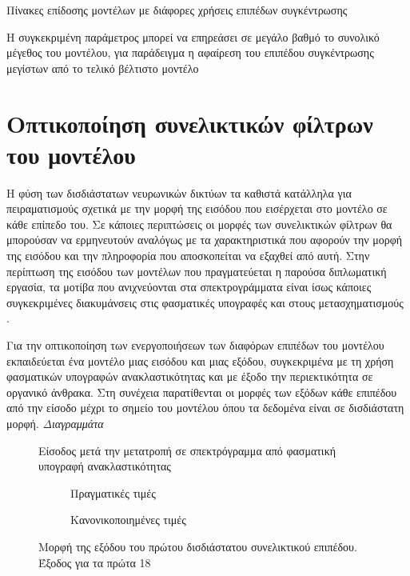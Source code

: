 Πίνακες επίδοσης μοντέλων με διάφορες χρήσεις επιπέδων συγκέντρωσης

Η συγκεκριμένη παράμετρος μπορεί να επηρεάσει σε μεγάλο βαθμό το συνολικό μέγεθος του μοντέλου, για παράδειγμα η αφαίρεση του επιπέδου συγκέντρωσης μεγίστων από το τελικό βέλτιστο μοντέλο

\section{Οπτικοποίηση συνελικτικών φίλτρων του μοντέλου}
Η φύση των δισδιάστατων νευρωνικών δικτύων τα καθιστά κατάλληλα για πειραματισμούς σχετικά με την μορφή της εισόδου που εισέρχεται στο μοντέλο σε κάθε επίπεδο του. Σε κάποιες περιπτώσεις οι μορφές των συνελικτικών φίλτρων θα μπορούσαν να ερμηνευτούν αναλόγως με τα χαρακτηριστικά που αφορούν την μορφή της εισόδου και την πληροφορία που αποσκοπείται να εξαχθεί από αυτή. Στην περίπτωση της εισόδου των μοντέλων που πραγματεύεται η παρούσα διπλωματική εργασία, τα μοτίβα που ανιχνεύονται στα σπεκτρογράμματα είναι ίσως κάποιες συγκεκριμένες διακυμάνσεις στις φασματικές υπογραφές και στους μετασχηματισμούς .

Για την οπτικοποίηση των ενεργοποιήσεων των διαφόρων επιπέδων του μοντέλου εκπαιδεύεται ένα μοντέλο μιας εισόδου και μιας εξόδου, συγκεκριμένα  με τη χρήση φασματικών υπογραφών ανακλαστικότητας και με έξοδο την περιεκτικότητα σε οργανικό άνθρακα. Στη συνέχεια παρατίθενται οι μορφές των εξόδων κάθε επιπέδου από την είσοδο μέχρι το σημείο του μοντέλου όπου τα δεδομένα είναι σε δισδιάστατη μορφή.
\textit{Διαγραμμάτα}
\begin{figure}[H]
  \begin{center}
    
    \caption{Είσοδος μετά την μετατροπή σε σπεκτρόγραμμα από φασματική υπογραφή ανακλαστικότητας}
  \end{center}
\end{figure}

\begin{figure}[htbp]
    \begin{subfigure}{0.5\textwidth}
        
        \caption{Πραγματικές τιμές}
        \label{fig:subim1}
    \end{subfigure}
    \begin{subfigure}{0.5\textwidth}
        
        \caption{Κανονικοποιημένες τιμές}
        \label{fig:subim1}
    \end{subfigure}
    \caption{Μορφή της εξόδου του πρώτου δισδιάστατου συνελικτικού επιπέδου. Έξοδος για τα πρώτα 18 }
\end{figure}

